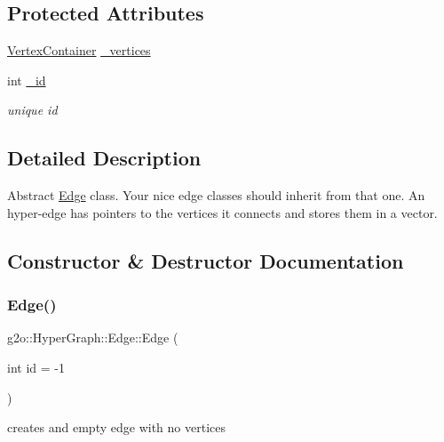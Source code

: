 \subsection*{Protected Attributes}
\begin{DoxyCompactItemize}
\item 
\mbox{\hyperlink{classg2o_1_1_hyper_graph_a9339534c99300a0ddac87ba976ef188c}{Vertex\+Container}} \mbox{\hyperlink{classg2o_1_1_hyper_graph_1_1_edge_aabb036d331fc7f2524ec8611b638de92}{\+\_\+vertices}}
\item 
int \mbox{\hyperlink{classg2o_1_1_hyper_graph_1_1_edge_aa1b6978624f7c165a4e0461cb5ff18fa}{\+\_\+id}}
\begin{DoxyCompactList}\small\item\em unique id \end{DoxyCompactList}\end{DoxyCompactItemize}


\subsection{Detailed Description}
Abstract \mbox{\hyperlink{classg2o_1_1_hyper_graph_1_1_edge}{Edge}} class. Your nice edge classes should inherit from that one. An hyper-\/edge has pointers to the vertices it connects and stores them in a vector. 

\subsection{Constructor \& Destructor Documentation}
\mbox{\label{classg2o_1_1_hyper_graph_1_1_edge_a891618b34652837ef0bee7084db81f2e}} 
\subsubsection{\texorpdfstring{Edge()}{Edge()}}
{\footnotesize\ttfamily g2o\+::\+Hyper\+Graph\+::\+Edge\+::\+Edge (\begin{DoxyParamCaption}\item[{int}]{id = {\ttfamily -\/1} }\end{DoxyParamCaption})\hspace{0.3cm}{\ttfamily [explicit]}}



creates and empty edge with no vertices 

